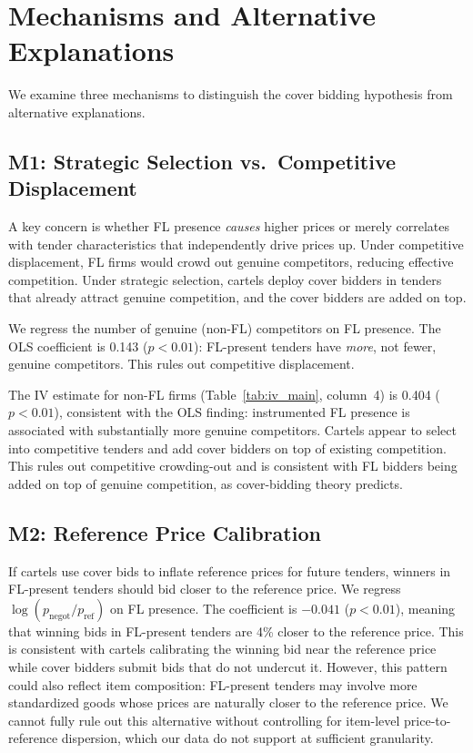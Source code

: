 \section{Mechanisms and Alternative Explanations}
\label{sec:mechanisms}

We examine three mechanisms to distinguish the cover bidding hypothesis
from alternative explanations.

\subsection{M1: Strategic Selection vs.\ Competitive Displacement}

A key concern is whether FL presence \emph{causes} higher prices or
merely correlates with tender characteristics that independently drive
prices up. Under competitive displacement, FL firms would crowd out
genuine competitors, reducing effective competition. Under strategic
selection, cartels deploy cover bidders in tenders that already attract
genuine competition, and the cover bidders are added on top.

We regress the number of genuine (non-FL) competitors on FL presence.
The OLS coefficient is 0.143 ($p < 0.01$): FL-present tenders have
\emph{more}, not fewer, genuine competitors. This rules out competitive
displacement.

The IV estimate for non-FL firms (Table~\ref{tab:iv_main}, column~4) is
0.404 ($p < 0.01$), consistent with the OLS finding: instrumented FL presence
is associated with substantially more genuine competitors. Cartels
appear to select into competitive tenders and add cover bidders on top
of existing competition. This rules out competitive crowding-out and is
consistent with FL bidders being added on top of genuine competition, as
cover-bidding theory predicts.

\subsection{M2: Reference Price Calibration}

If cartels use cover bids to inflate reference prices for future
tenders, winners in FL-present tenders should bid closer to the
reference price. We regress $\log(p_{\text{negot}} / p_{\text{ref}})$ on
FL presence. The coefficient is $-0.041$ ($p < 0.01$), meaning
that winning bids in FL-present tenders are 4\% closer to the reference
price. This is consistent with cartels calibrating the winning bid near
the reference price while cover bidders submit bids that do not
undercut it. However, this pattern could also reflect item %
composition: FL-present tenders may involve more standardized goods
whose prices are naturally closer to the reference price. We cannot
fully rule out this alternative without controlling for item-level
price-to-reference dispersion, which our data do not support at
sufficient granularity.

